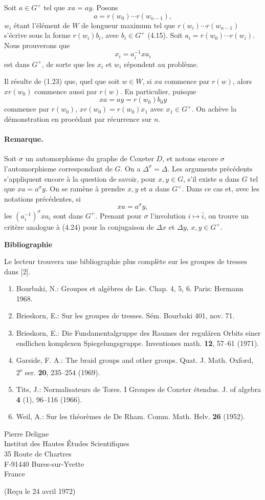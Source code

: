 \documentclass[10pt,a4paper]{article}
\begin{document}
Soit \(a\in G^+\) tel que \(xa=ay\). Posons
\[
a=r(w_0)\cdots r(w_{n-1}),
\]
\(w_i\) étant l'élément de \(W\) de longueur maximum tel que \(r(w_i)\cdots r(w_{n-1})\) s'écrive sous la forme \(r(w_i)b_i\), avec \(b_i\in G^+\) (4.15). Soit \(a_i=r(w_0)\cdots r(w_i)\). Nous prouverons que
\[
x_i=a_i^{-1}xa_i
\]
est dans \(G^+\), de sorte que les \(x_i\) et \(w_i\) répondent au problème.

Il résulte de (1.23) que, quel que soit \(w\in W\), si \(xa\) commence par \(r(w)\), alors \(xr(w_0)\) commence aussi par \(r(w)\). En particulier, puisque
\[
xa=ay=r(w_0)b_0y
\]
commence par \(r(w_0)\), \(xr(w_0)=r(w_0)x_1\) avec \(x_1\in G^+\). On achève la démonstration en procédant par récurrence sur \(n\).

\paragraph{Remarque.} Soit \(\sigma\) un automorphisme du graphe de Coxeter \(D\), et notons encore \(\sigma\) l'automorphisme correspondant de \(G\). On a \(\Delta^\sigma=\Delta\). Les arguments précédents s'appliquent encore à la question de savoir, pour \(x,y\in G\), s'il existe \(a\) dans \(G\) tel que \(xa=a^\sigma y\). On se ramène à prendre \(x,y\) et \(a\) dans \(G^+\). Dans ce cas et, avec les notations précédentes, si
\[
xa=a^\sigma y,
\]
les \((a_i^{-1})^\sigma x a_i\) sont dans \(G^+\). Prenant pour \(\sigma\) l'involution \(i\mapsto\bar i\), on trouve un critère analogue à (4.24) pour la conjugaison de \(\Delta x\) et \(\Delta y\), \(x,y\in G^+\).

\begin{center}
\bfseries Bibliographie
\end{center}
Le lecteur trouvera une bibliographie plus complète sur les groupes de tresses dans [2].
\begin{enumerate}[label=\arabic*.]
\item Bourbaki, N.: Groupes et algèbres de Lie. Chap. 4, 5, 6. Paris: Hermann 1968.
\item Brieskorn, E.: Sur les groupes de tresses. Sém. Bourbaki 401, nov. 71.
\item Brieskorn, E.: Die Fundamentalgruppe des Raumes der regulären Orbits einer endlichen komplexen Spiegelungsgruppe. Inventiones math. \textbf{12}, 57--61 (1971).
\item Garside, F. A.: The braid groups and other groups. Quat. J. Math. Oxford, 2\textsuperscript{e} ser. \textbf{20}, 235--254 (1969).
\item Tits, J.: Normalisateurs de Tores. I Groupes de Coxeter étendus. J. of algebra \textbf{4} (1), 96--116 (1966).
\item Weil, A.: Sur les théorèmes de De Rham. Comm. Math. Helv. \textbf{26} (1952).
\end{enumerate}

\begin{flushright}
Pierre Deligne\\
Institut des Hautes Études Scientifiques\\
35 Route de Chartres\\
F-91440 Bures-sur-Yvette\\
France
\end{flushright}

\begin{center}
(Reçu le 24 avril 1972)
\end{center}
\end{document}
